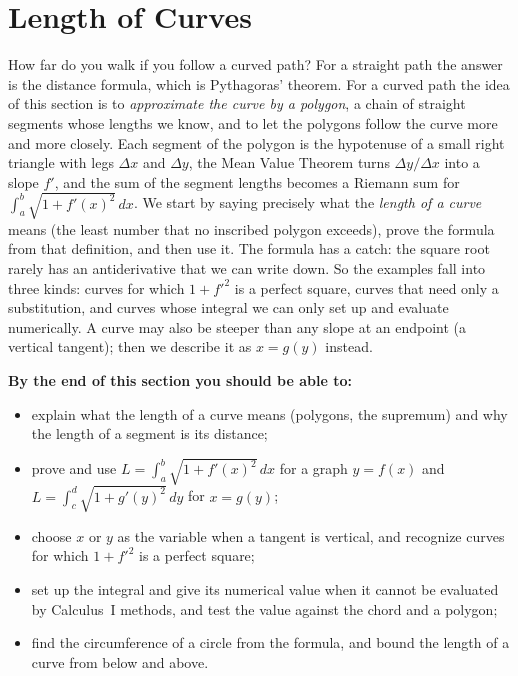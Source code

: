 \documentclass[11pt]{article}
\begin{document}
\section{Length of Curves}

\begin{guide}
How far do you walk if you follow a curved path? For a straight path the answer is the distance formula, which is Pythagoras' theorem. For a curved path the idea of this section is to \emph{approximate the curve by a polygon}, a chain of straight segments whose lengths we know, and to let the polygons follow the curve more and more closely. Each segment of the polygon is the hypotenuse of a small right triangle with legs $\Delta x$ and $\Delta y$, the Mean Value Theorem turns $\Delta y/\Delta x$ into a slope $f'$, and the sum of the segment lengths becomes a Riemann sum for $\int_a^b\sqrt{1+f'(x)^2}\,dx$. We start by saying precisely what the \emph{length of a curve} means (the least number that no inscribed polygon exceeds), prove the formula from that definition, and then use it. The formula has a catch: the square root rarely has an antiderivative that we can write down. So the examples fall into three kinds: curves for which $1+f'^2$ is a perfect square, curves that need only a substitution, and curves whose integral we can only set up and evaluate numerically. A curve may also be steeper than any slope at an endpoint (a vertical tangent); then we describe it as $x=g(y)$ instead.
\end{guide}

\textbf{By the end of this section you should be able to:}
\begin{itemize}
  \item explain what the length of a curve means (polygons, the supremum) and why the length of a segment is its distance;
  \item prove and use $L=\int_a^b\sqrt{1+f'(x)^2}\,dx$ for a graph $y=f(x)$ and $L=\int_c^d\sqrt{1+g'(y)^2}\,dy$ for $x=g(y)$;
  \item choose $x$ or $y$ as the variable when a tangent is vertical, and recognize curves for which $1+f'^2$ is a perfect square;
  \item set up the integral and give its numerical value when it cannot be evaluated by Calculus~I methods, and test the value against the chord and a polygon;
  \item find the circumference of a circle from the formula, and bound the length of a curve from below and above.
\end{itemize}
\end{document}
